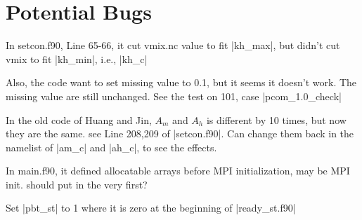 \section{Potential Bugs}
\been
\item In setcon.f90, Line 65-66, it cut vmix.nc value to fit |kh_max|, but didn't 
cut vmix to fit |kh_min|, i.e., |kh_c|

Also, the code want to set missing value to 0.1, but it seems it doesn't work.
The missing value are still unchanged. See the test on 101, case
|pcom_1.0_check|

\item In the old code of Huang and Jin, $A_m$ and $A_h$ is different by 10 times, but
now they are the same. see Line 208,209 of |setcon.f90|. Can change them back
in the namelist of |am_c| and |ah_c|, to see the effects.

\item In main.f90, it defined allocatable arrays before MPI initialization, may
  be MPI init. should put in the very first?

\item Set |pbt_st| to 1 where it is zero at the beginning of |ready_st.f90|
\enen

